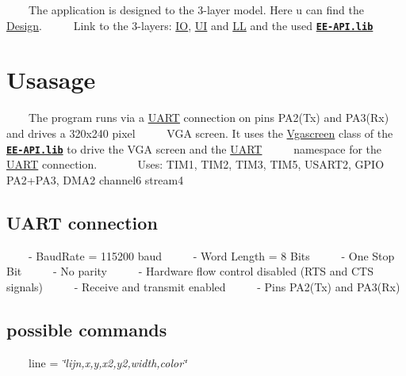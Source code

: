 ~~~~The application is designed to the 3-\/layer model. Here u can find the \mbox{\hyperlink{_design}{Design}}.~\newline
 ~~~~Link to the 3-\/layers\+: \mbox{\hyperlink{namespace_i_o}{IO}}, \mbox{\hyperlink{namespace_u_i}{UI}} and \mbox{\hyperlink{namespace_l_l}{LL}} and the used {\bfseries \href{_e_e-_a_p_i_8lib.html}{\tt E\+E-\/\+A\+P\+I.\+lib}}~\newline
\hypertarget{index_usage_sec}{}\section{Usasage}\label{index_usage_sec}
~~~~The program runs via a \mbox{\hyperlink{namespace_u_a_r_t}{U\+A\+RT}} connection on pins P\+A2(\+Tx) and P\+A3(\+Rx) and drives a 320x240 pixel~\newline
 ~~~~V\+GA screen. It uses the \mbox{\hyperlink{class_vgascreen}{Vgascreen}} class of the {\bfseries \href{_e_e-_a_p_i_8lib.html}{\tt E\+E-\/\+A\+P\+I.\+lib}} to drive the V\+GA screen and the \mbox{\hyperlink{namespace_u_a_r_t}{U\+A\+RT}}~\newline
 ~~~~namespace for the \mbox{\hyperlink{namespace_u_a_r_t}{U\+A\+RT}} connection.~\newline
 ~\newline
 ~~~~Uses\+: T\+I\+M1, T\+I\+M2, T\+I\+M3, T\+I\+M5, U\+S\+A\+R\+T2, G\+P\+IO P\+A2+\+P\+A3, D\+M\+A2 channel6 stream4\hypertarget{index_uart_sec}{}\subsection{U\+A\+R\+T connection}\label{index_uart_sec}
~~~~-\/ Baud\+Rate = 115200 baud~\newline
 ~~~~-\/ Word Length = 8 Bits~\newline
 ~~~~-\/ One Stop Bit~\newline
 ~~~~-\/ No parity~\newline
 ~~~~-\/ Hardware flow control disabled (R\+TS and C\+TS signals)~\newline
 ~~~~-\/ Receive and transmit enabled~\newline
 ~~~~-\/ Pins P\+A2(\+Tx) and P\+A3(\+Rx)~\newline
\hypertarget{index_input_sec}{}\subsection{possible commands}\label{index_input_sec}
~~~~line = {\itshape \char`\"{}lijn,x,y,x2,y2,width,color\char`\"{}}~\newline
